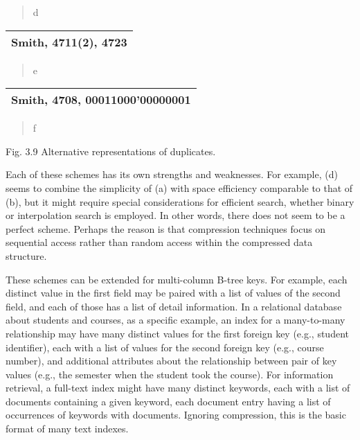 \begin{quote}
d
\end{quote}

\begin{longtable}[]{@{}l@{}}
\toprule
\endhead
Smith, 4711(2), 4723\tabularnewline
\bottomrule
\end{longtable}

\begin{quote}
e
\end{quote}

\begin{longtable}[]{@{}l@{}}
\toprule
\endhead
Smith, 4708, 00011000'00000001\tabularnewline
\bottomrule
\end{longtable}

\begin{quote}
f
\end{quote}

Fig. 3.9 Alternative representations of duplicates.

Each of these schemes has its own strengths and weaknesses. For example,
(d) seems to combine the simplicity of (a) with space efficiency
comparable to that of (b), but it might require special considerations
for efficient search, whether binary or interpolation search is
employed. In other words, there does not seem to be a perfect scheme.
Perhaps the reason is that compression techniques focus on sequential
access rather than random access within the compressed data structure.

These schemes can be extended for multi-column B-tree keys. For example,
each distinct value in the first field may be paired with a list of
values of the second field, and each of those has a list of detail
information. In a relational database about students and courses, as a
specific example, an index for a many-to-many relationship may have many
distinct values for the first foreign key (e.g., student identifier),
each with a list of values for the second foreign key (e.g., course
number), and additional attributes about the relationship between pair
of key values (e.g., the semester when the student took the course). For
information retrieval, a full-text index might have many distinct
keywords, each with a list of documents containing a given keyword, each
document entry having a list of occurrences of keywords with documents.
Ignoring compression, this is the basic format of many text indexes.

